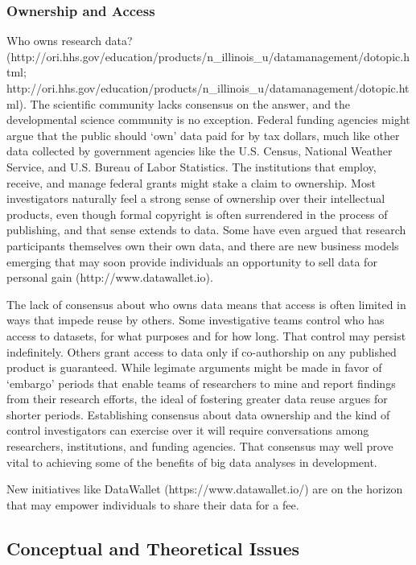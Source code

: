 \documentclass[letterpaper,man,apacite]{apa6}
\begin{document}
\subsubsection{Ownership and Access}

Who owns research data? (http://ori.hhs.gov/education/products/n_illinois_u/datamanagement/dotopic.html; http://ori.hhs.gov/education/products/n_illinois_u/datamanagement/dotopic.html).
The scientific community lacks consensus on the answer, and the developmental science community is no exception.
Federal funding agencies might argue that the public should `own' data paid for by tax dollars, much like other data collected by government agencies like the U.S. Census, National Weather Service, and U.S. Bureau of Labor Statistics.
The institutions that employ, receive, and manage federal grants might stake a claim to ownership.
Most investigators naturally feel a strong sense of ownership over their intellectual products, even though formal copyright is often surrendered in the process of publishing, and that sense extends to data.
Some have even argued that research participants themselves own their own data, and there are new business models emerging that may soon provide individuals an opportunity to sell data for personal gain (http://www.datawallet.io).

The lack of consensus about who owns data means that access is often limited in ways that impede reuse by others.
Some investigative teams control who has access to datasets, for what purposes and for how long.
That control may persist indefinitely.
Others grant access to data only if co-authorship on any published product is guaranteed.
While legimate arguments might be made in favor of `embargo' periods that enable teams of researchers to mine and report findings from their research efforts, the ideal of fostering greater data reuse argues for shorter periods.
Establishing consensus about data ownership and the kind of control investigators can exercise over it will require conversations among researchers, institutions, and funding agencies.
That consensus may well prove vital to achieving some of the benefits of big data analyses in development. 

New initiatives like DataWallet (https://www.datawallet.io/) are on the horizon that may empower individuals to share their data for a fee.

\subsection{Conceptual and Theoretical Issues}
\end{document}
